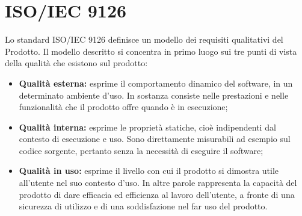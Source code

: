 \newpage
\section{ISO/IEC 9126}
Lo standard ISO/IEC 9126 definisce un modello dei requisiti qualitativi del Prodotto.
Il modello descritto si concentra in primo luogo sui tre punti di vista della qualità che esistono sul prodotto:
\begin{itemize}
	\item \textbf{Qualità esterna:} esprime il comportamento dinamico del software, in un determinato ambiente d'uso. In sostanza consiste nelle prestazioni e nelle funzionalità che il prodotto offre quando è in esecuzione;
	\item \textbf{Qualità interna:} esprime le proprietà statiche, cioè
	indipendenti dal contesto di esecuzione e uso. Sono direttamente misurabili ad esempio sul
	codice sorgente, pertanto senza la necessità di eseguire il software;
	\item \textbf{Qualità in uso:} esprime il livello con cui il prodotto si dimostra utile all'utente nel suo contesto d'uso. In altre parole rappresenta la capacità del prodotto di dare efficacia ed efficienza al lavoro dell'utente, a fronte di una sicurezza di utilizzo e di una soddisfazione nel far uso del prodotto.
\end{itemize}
